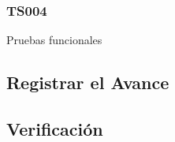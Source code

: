 %
%
%

\subsubsection{TS004}
\label{subs:TS004}

Pruebas funcionales

\subsection{Registrar el Avance}
\label{sub:iteracion2_avance}

\subsection{Verificación}
\label{sub:iteracion2_verificacion}
